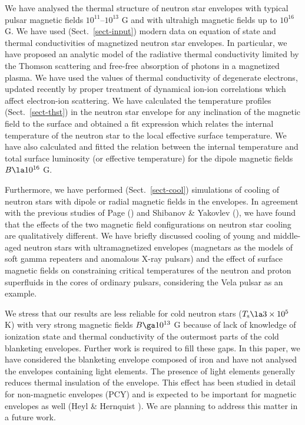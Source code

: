 \documentclass{aa}
\begin{document}
We have analysed the thermal structure of neutron star
envelopes with typical pulsar magnetic fields
$10^{11}$--$10^{13}$ G and with ultrahigh
magnetic fields up to $10^{16}$ G.
We have used (Sect.\ \ref{sect-input})
modern data on equation of state
and thermal conductivities of magnetized neutron star
envelopes. In particular, we have proposed
an analytic model of the radiative thermal
conductivity limited by the Thomson scattering
and free-free absorption of photons in a magnetized
plasma. We have used the values of thermal conductivity
of degenerate electrons, updated recently by
proper treatment of dynamical ion-ion
correlations which affect electron-ion scattering.
We have calculated the temperature profiles
(Sect.\ \ref{sect-thst})
in the neutron star envelope for any
inclination of the magnetic field to the surface
and obtained a fit expression
which relates the internal temperature of the neutron
star to the local effective surface temperature.
We have also calculated and fitted the
relation between the internal temperature and
total surface luminosity (or effective
temperature) for the dipole magnetic fields
$B \la 10^{16}$ G. 

Furthermore, we have performed (Sect.\ \ref{sect-cool}) 
simulations of cooling
of neutron stars with dipole or radial magnetic fields in the envelopes.
In agreement with the previous studies of
Page (\cite{page95}) and Shibanov \& Yakovlev (\cite{shibyak}),
we have found that the effects 
of the two magnetic field configurations
on neutron star cooling
are qualitatively different. We have briefly discussed
cooling of young and middle-aged neutron stars
with ultramagnetized envelopes (magnetars as the models
of soft gamma repeaters and anomalous
X-ray pulsars) and the effect of surface
magnetic fields on constraining critical
temperatures of the neutron and proton superfluids
in the cores of ordinary pulsars, considering the
Vela pulsar as an example.

We stress that our results are less
reliable for cold neutron stars
($T_\mathrm{s} \la 3 \times 10^5$ K) with
very strong magnetic fields $B \ga 10^{13}$ G
because of lack of knowledge of ionization
state and thermal conductivity of
the outermost parts of the cold blanketing envelopes.
Further work is required to fill these gaps. 
In this paper, we have considered
the blanketing envelope composed of
iron and have not analysed the envelopes
containing light elements.
The presence of light elements generally
reduces thermal insulation of the envelope.
This effect has been studied in detail
for non-magnetic envelopes (PCY)
and is expected to be important
for magnetic envelopes as well (Heyl \&
Hernquist  \cite{HH97}). We are planning to address
this matter in a future work.
\end{document}
